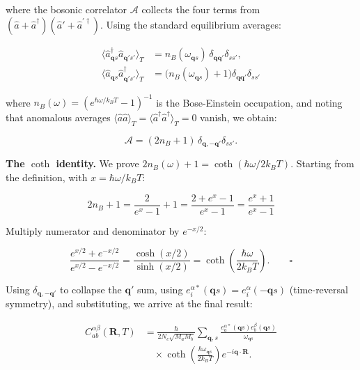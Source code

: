 \documentclass[aps,prb,reprint,amsmath,amssymb,floatfix]{revtex4-2}
\begin{document}
where the bosonic correlator \(\mathcal{A}\) collects the four terms
from \((\hat{a}+\hat{a}^\dagger)(\hat{a}'+\hat{a}^{\prime\dagger})\).
Using the standard equilibrium averages:

\begin{align*}
\langle\hat{a}_{\mathbf{q}s}^\dagger\hat{a}_{\mathbf{q}'s'}\rangle_T
  &= n_B(\omega_{\mathbf{q}s})\,\delta_{\mathbf{q}\mathbf{q}'}\delta_{ss'}, \\
\langle\hat{a}_{\mathbf{q}s}\hat{a}_{\mathbf{q}'s'}^\dagger\rangle_T
  &= \bigl(n_B(\omega_{\mathbf{q}s})+1\bigr)\delta_{\mathbf{q}\mathbf{q}'}\delta_{ss'}
\end{align*}

where \(n_B(\omega) = (e^{\hbar\omega/k_BT}-1)^{-1}\) is the
Bose-Einstein occupation, and noting that anomalous averages
\(\langle\hat{a}\hat{a}\rangle_T = \langle\hat{a}^\dagger\hat{a}^\dagger\rangle_T = 0\)
vanish, we obtain:

\color{revisionblue}
\begin{equation*}
\mathcal A=(2n_B+1)\,
\delta_{\mathbf q,-\mathbf q'}\delta_{ss'} .
\end{equation*}
\color{black}

\textbf{The \(\coth\) identity.} We prove
\(2n_B(\omega)+1 = \coth(\hbar\omega/2k_BT)\). Starting from the
definition, with \(x = \hbar\omega/k_BT\):

\begin{equation*}
2n_B+1 = \frac{2}{e^x-1}+1 = \frac{2+e^x-1}{e^x-1} = \frac{e^x+1}{e^x-1}
\end{equation*}

Multiply numerator and denominator by \(e^{-x/2}\):

\color{revisionblue}
\begin{equation*}
\frac{e^{x/2}+e^{-x/2}}{e^{x/2}-e^{-x/2}}
=\frac{\cosh(x/2)}{\sinh(x/2)}
=\coth\!\left(\frac{\hbar\omega}{2k_BT}\right). \qquad \square
\end{equation*}
\color{black}

Using \(\delta_{\mathbf{q},-\mathbf{q}'}\) to collapse the
\(\mathbf{q}'\) sum, using
\(e_i^{\alpha*}(\mathbf{q}s) = e_i^\alpha(-\mathbf{q}s)\) (time-reversal
symmetry), and substituting, we arrive at the final result:

\color{revisionblue}
{\footnotesize
\begin{equation*}
\boxed{\begin{aligned}
C_{ab}^{\alpha\beta}(\mathbf R,T)
 &=\frac{\hbar}{2N_c\sqrt{M_aM_b}}\sum_{\mathbf q,s}
 \frac{e_a^{\alpha*}(\mathbf q s)e_b^\beta(\mathbf q s)}
 {\omega_{\mathbf q s}}\\
 &\quad\times
 \coth\!\left(\frac{\hbar\omega_{\mathbf q s}}{2k_BT}\right)
 e^{-i\mathbf q\cdot\mathbf R}.
\end{aligned}}
\end{equation*}
}
\color{black}
\end{document}
